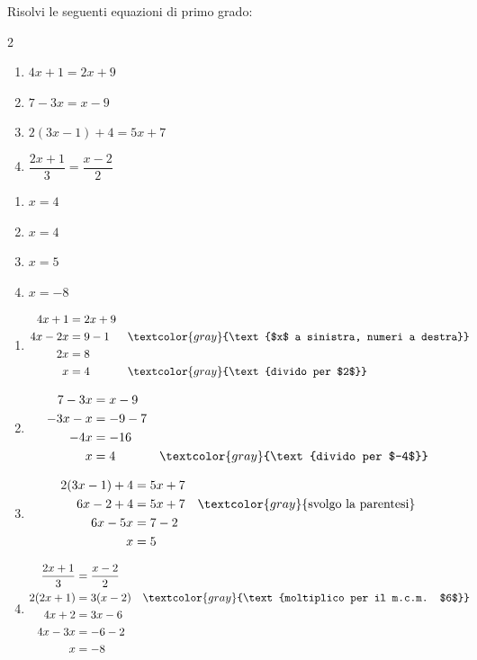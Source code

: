 
\begin{question}[ID=2.3, subtitle={Equazioni di primo grado}, difficulty=facile, tags={equazioni lineari}]
Risolvi le seguenti equazioni di primo grado:
\begin{multicols}{2}
\begin{enumerate}[leftmargin=3cm]
    \item $4x + 1 = 2x + 9$
    \item $7 - 3x = x - 9$
    \item $2(3x - 1) + 4 = 5x + 7$
    \item $\dfrac{2x+1}{3} = \dfrac{x-2}{2}$
\end{enumerate}
\end{multicols}
\begin{solution}
\begin{enumerate}
    \item $x=4$
    \item $x=4$
    \item $x=5$
    \item $x=-8$
\end{enumerate}
\end{solution}
\begin{explanation}
\begin{enumerate}
    \item \[\begin{aligned}
    4x+1 &= 2x+9\\
    4x-2x &= 9-1 && \textcolor{gray}{\text{$x$ a sinistra, numeri a destra}}\\
    2x &= 8\\
    x &= 4 && \textcolor{gray}{\text{divido per $2$}}
    \end{aligned}\]
    \item \[\begin{aligned}
    7-3x &= x-9\\
    -3x-x &= -9-7\\
    -4x &= -16\\
    x &= 4 && \textcolor{gray}{\text{divido per $-4$}}
    \end{aligned}\]
    \item \[\begin{aligned}
    2(3x-1)+4 &= 5x+7\\
    6x-2+4 &= 5x+7 && \textcolor{gray}{\text{svolgo la parentesi}}\\
    6x-5x &= 7-2\\
    x &= 5
    \end{aligned}\]
    \item \[\begin{aligned}
    \dfrac{2x+1}{3} &= \dfrac{x-2}{2}\\
    2(2x+1) &= 3(x-2) && \textcolor{gray}{\text{moltiplico per il m.c.m. $6$}}\\
    4x+2 &= 3x-6\\
    4x-3x &= -6-2\\
    x &= -8
    \end{aligned}\]
\end{enumerate}
\end{explanation}
\end{question}

